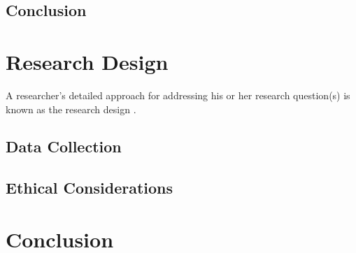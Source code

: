 \subsection{Conclusion}


\section{Research Design}
A researcher's detailed approach for addressing his or her research question(s) is known as the research design \citep{mardiana2020modifying}.
\subsection{Data Collection}
\subsection{Ethical Considerations}


\section{Conclusion}
